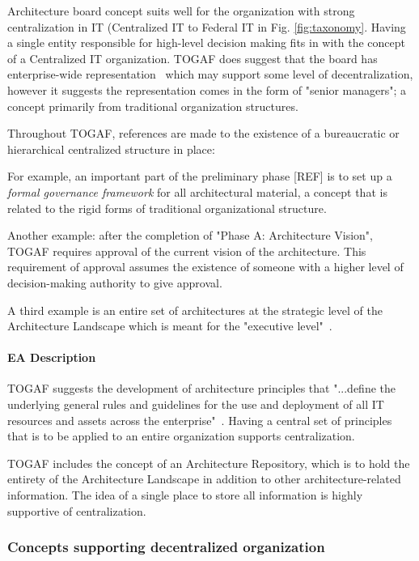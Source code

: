 Architecture board concept suits well for the organization with strong centralization in IT (Centralized IT to Federal IT in Fig. \ref{fig:taxonomy}.  Having a single entity responsible for high-level decision making fits in with the concept of a Centralized IT organization. TOGAF does suggest that the board has enterprise-wide representation~\cite[Ch. 47]{togaf9.1} which may support some level of decentralization, however it suggests the representation comes in the form of "senior managers"; a concept primarily from traditional organization structures. 

Throughout TOGAF, references are made to the existence of a bureaucratic or hierarchical centralized structure in place: 

For example, an important part of the preliminary phase [REF] is to set up a \textit{formal governance framework} for all architectural material, a concept that is related to the rigid forms of traditional organizational structure. 

Another example: after the completion of "Phase A: Architecture Vision", TOGAF requires approval of the current vision of the architecture. This requirement of approval assumes the existence of someone with a higher level of decision-making authority to give approval. 

A third example is an entire set of architectures at the strategic level of the Architecture Landscape which is meant for the "executive level"~\cite[Ch. 20]{togaf9.1}.

\paragraph*{EA Description}
TOGAF suggests the development of architecture principles that "...define the underlying general rules and guidelines for the use and deployment of all IT resources and assets across the enterprise"~\cite[Ch. 23]{togaf9.1}. Having a central set of principles that is to be applied to an entire organization supports centralization.

TOGAF includes the concept of an Architecture Repository, which is to hold the entirety of the Architecture Landscape in addition to other architecture-related information. The idea of a single place to store all information is highly supportive of centralization. 

\subsubsection{Concepts supporting decentralized organization}
